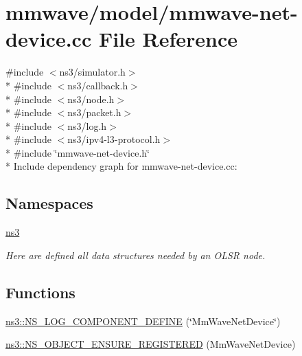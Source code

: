 \hypertarget{mmwave-net-device_8cc}{}\section{mmwave/model/mmwave-\/net-\/device.cc File Reference}
\label{mmwave-net-device_8cc}
{\ttfamily \#include $<$ns3/simulator.\+h$>$}\\*
{\ttfamily \#include $<$ns3/callback.\+h$>$}\\*
{\ttfamily \#include $<$ns3/node.\+h$>$}\\*
{\ttfamily \#include $<$ns3/packet.\+h$>$}\\*
{\ttfamily \#include $<$ns3/log.\+h$>$}\\*
{\ttfamily \#include $<$ns3/ipv4-\/l3-\/protocol.\+h$>$}\\*
{\ttfamily \#include \char`\"{}mmwave-\/net-\/device.\+h\char`\"{}}\\*
Include dependency graph for mmwave-\/net-\/device.cc\+:
\subsection*{Namespaces}
\begin{DoxyCompactItemize}
\item 
 \hyperlink{namespacens3}{ns3}
\begin{DoxyCompactList}\small\item\em Here are defined all data structures needed by an O\+L\+SR node. \end{DoxyCompactList}\end{DoxyCompactItemize}
\subsection*{Functions}
\begin{DoxyCompactItemize}
\item 
\hyperlink{namespacens3_a4a8d5c39c0aed97fe30477dc7eddf340}{ns3\+::\+N\+S\+\_\+\+L\+O\+G\+\_\+\+C\+O\+M\+P\+O\+N\+E\+N\+T\+\_\+\+D\+E\+F\+I\+NE} (\char`\"{}Mm\+Wave\+Net\+Device\char`\"{})
\item 
\hyperlink{namespacens3_aade3532aca9ef9f3a82dfe92feb0e638}{ns3\+::\+N\+S\+\_\+\+O\+B\+J\+E\+C\+T\+\_\+\+E\+N\+S\+U\+R\+E\+\_\+\+R\+E\+G\+I\+S\+T\+E\+R\+ED} (Mm\+Wave\+Net\+Device)
\end{DoxyCompactItemize}
